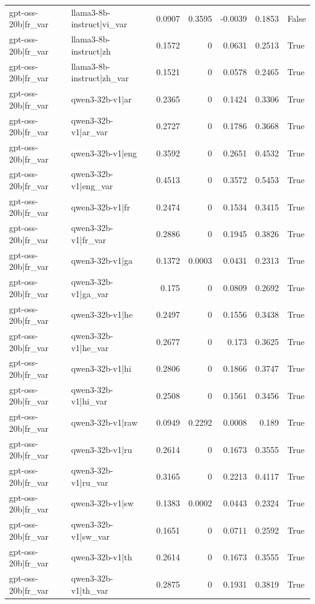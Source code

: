 \begin{table}
\begin{tabular}{l l r r r r l}
gpt-oss-20b|fr_var & llama3-8b-instruct|vi_var & 0.0907 & 0.3595 & -0.0039 & 0.1853 & False \\
gpt-oss-20b|fr_var & llama3-8b-instruct|zh & 0.1572 & 0 & 0.0631 & 0.2513 & True \\
gpt-oss-20b|fr_var & llama3-8b-instruct|zh_var & 0.1521 & 0 & 0.0578 & 0.2465 & True \\
gpt-oss-20b|fr_var & qwen3-32b-v1|ar & 0.2365 & 0 & 0.1424 & 0.3306 & True \\
gpt-oss-20b|fr_var & qwen3-32b-v1|ar_var & 0.2727 & 0 & 0.1786 & 0.3668 & True \\
gpt-oss-20b|fr_var & qwen3-32b-v1|eng & 0.3592 & 0 & 0.2651 & 0.4532 & True \\
gpt-oss-20b|fr_var & qwen3-32b-v1|eng_var & 0.4513 & 0 & 0.3572 & 0.5453 & True \\
gpt-oss-20b|fr_var & qwen3-32b-v1|fr & 0.2474 & 0 & 0.1534 & 0.3415 & True \\
gpt-oss-20b|fr_var & qwen3-32b-v1|fr_var & 0.2886 & 0 & 0.1945 & 0.3826 & True \\
gpt-oss-20b|fr_var & qwen3-32b-v1|ga & 0.1372 & 0.0003 & 0.0431 & 0.2313 & True \\
gpt-oss-20b|fr_var & qwen3-32b-v1|ga_var & 0.175 & 0 & 0.0809 & 0.2692 & True \\
gpt-oss-20b|fr_var & qwen3-32b-v1|he & 0.2497 & 0 & 0.1556 & 0.3438 & True \\
gpt-oss-20b|fr_var & qwen3-32b-v1|he_var & 0.2677 & 0 & 0.173 & 0.3625 & True \\
gpt-oss-20b|fr_var & qwen3-32b-v1|hi & 0.2806 & 0 & 0.1866 & 0.3747 & True \\
gpt-oss-20b|fr_var & qwen3-32b-v1|hi_var & 0.2508 & 0 & 0.1561 & 0.3456 & True \\
gpt-oss-20b|fr_var & qwen3-32b-v1|raw & 0.0949 & 0.2292 & 0.0008 & 0.189 & True \\
gpt-oss-20b|fr_var & qwen3-32b-v1|ru & 0.2614 & 0 & 0.1673 & 0.3555 & True \\
gpt-oss-20b|fr_var & qwen3-32b-v1|ru_var & 0.3165 & 0 & 0.2213 & 0.4117 & True \\
gpt-oss-20b|fr_var & qwen3-32b-v1|sw & 0.1383 & 0.0002 & 0.0443 & 0.2324 & True \\
gpt-oss-20b|fr_var & qwen3-32b-v1|sw_var & 0.1651 & 0 & 0.0711 & 0.2592 & True \\
gpt-oss-20b|fr_var & qwen3-32b-v1|th & 0.2614 & 0 & 0.1673 & 0.3555 & True \\
gpt-oss-20b|fr_var & qwen3-32b-v1|th_var & 0.2875 & 0 & 0.1931 & 0.3819 & True \\

\end{tabular}
\end{table}
